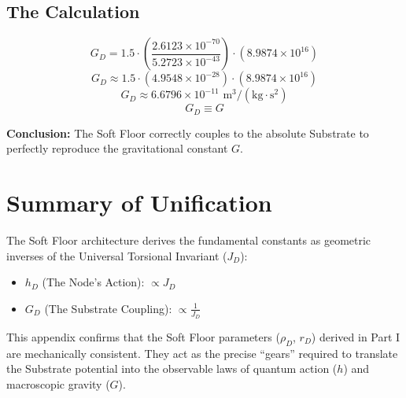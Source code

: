 \subsection{The Calculation}
\begin{equation}
    G_D = 1.5 \cdot \left(\frac{2.6123 \times 10^{-70}}{5.2723 \times 10^{-43}}\right) \cdot (8.9874 \times 10^{16})
\end{equation}
\begin{equation}
    G_D \approx 1.5 \cdot (4.9548 \times 10^{-28}) \cdot (8.9874 \times 10^{16})
\end{equation}
\begin{equation}
    G_D \approx 6.6796 \times 10^{-11} \text{ m}^3/(\text{kg}\cdot\text{s}^2)
\end{equation}
\begin{equation}
    G_D \equiv G
\end{equation}

\textbf{Conclusion:} The Soft Floor correctly couples to the absolute Substrate to perfectly reproduce the gravitational constant $G$.

\section{Summary of Unification}
The Soft Floor architecture derives the fundamental constants as geometric inverses of the Universal Torsional Invariant ($J_D$):
\begin{itemize}
    \item $h_D$ (The Node's Action): $\propto J_D$
    \item $G_D$ (The Substrate Coupling): $\propto \frac{1}{J_D}$
\end{itemize}

This appendix confirms that the Soft Floor parameters ($\rho_D$, $r_D$) derived in Part I are mechanically consistent. They act as the precise ``gears'' required to translate the Substrate potential into the observable laws of quantum action ($h$) and macroscopic gravity ($G$).
